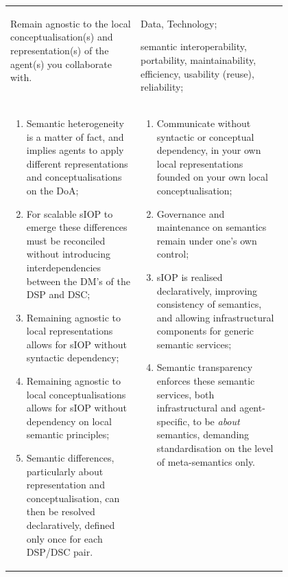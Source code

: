 \begin{xltabular}[l]{\linewidth}{@{} >{\small\raggedright\arraybackslash}p{0.47\linewidth} >{\small\raggedright\arraybackslash}X @{}}
\begin{mmdp}
\quad Remain agnostic to the local conceptualisation(s) and representation(s) of the agent(s) you collaborate with. \end{mmdp}
&
\begin{description}[labelwidth=3.7cm,leftmargin=3.7cm+1ex,nosep,topsep=2ex,labelsep=1ex,font=\bfseries]
\item[Type of information:] Data, Technology;
\item[Quality attributes:] semantic interoperability, portability, maintainability, efficiency, usability (reuse), reliability;
\end{description}
\\
\begin{enumerate}[left=6pt, nosep]
  \item Semantic heterogeneity is a matter of fact, and implies agents to apply different representations and conceptualisations on the DoA;
  \item For scalable sIOP to emerge these differences must be reconciled without introducing interdependencies between the DM's of the DSP and DSC;
  \item Remaining agnostic to local representations allows for sIOP without syntactic dependency;
  \item Remaining agnostic to local conceptualisations allows for sIOP without dependency on local semantic principles;
  \item Semantic differences, particularly about representation and conceptualisation, can then be resolved declaratively, defined only once for each DSP/DSC pair.
\end{enumerate}
&
\begin{enumerate}[left=10pt, nosep]
  \item Communicate without syntactic or conceptual dependency, in your own local representations founded on your own local conceptualisation;
  \item Governance and maintenance on semantics remain under one's own control;
  \item sIOP is realised declaratively, improving consistency of semantics, and allowing infrastructural components for generic semantic services;
  \item Semantic transparency enforces these semantic services, both infrastructural and agent-specific, to be \emph{about} semantics, demanding standardisation on the level of meta-semantics only.
\end{enumerate} \\
%
%
%

\end{xltabular}

